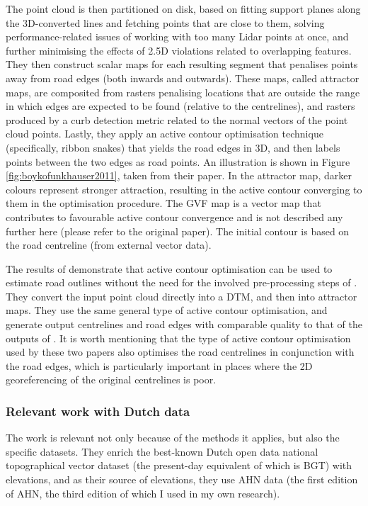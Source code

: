 The point cloud is then partitioned on disk, based on fitting support planes along the 3D-converted lines and fetching points that are close to them, solving performance-related issues of working with too many Lidar points at once, and further minimising the effects of 2.5D violations related to overlapping features. They then construct scalar maps for each resulting segment that penalises points away from road edges (both inwards and outwards). These maps, called attractor maps, are composited from rasters penalising locations that are outside the range in which edges are expected to be found (relative to the centrelines), and rasters produced by a curb detection metric related to the normal vectors of the point cloud points. Lastly, they apply an active contour optimisation technique (specifically, ribbon snakes) that yields the road edges in 3D, and then labels points between the two edges as road points. An illustration is shown in Figure \ref{fig:boykofunkhauser2011}, taken from their paper. In the attractor map, darker colours represent stronger attraction, resulting in the active contour converging to them in the optimisation procedure. The GVF map is a vector map that contributes to favourable active contour convergence and is not described any further here (please refer to the original paper). The initial contour is based on the road centreline (from external vector data).

The results of \cite{gopfert_etal_2011} demonstrate that active contour optimisation can be used to estimate road outlines without the need for the involved pre-processing steps of \cite{boyko_funkhauser_2011}. They convert the input point cloud directly into a DTM, and then into attractor maps. They use the same general type of active contour optimisation, and generate output centrelines and road edges with comparable quality to that of the outputs of \cite{boyko_funkhauser_2011}. It is worth mentioning that the type of active contour optimisation used by these two papers also optimises the road centrelines in conjunction with the road edges, which is particularly important in places where the 2D georeferencing of the original centrelines is poor.

\subsubsection{Relevant work with Dutch data}

The work \cite{oudeElberink_vosselman_2006} is relevant not only because of the methods it applies, but also the specific datasets. They enrich the best-known Dutch open data national topographical vector dataset (the present-day equivalent of which is BGT) with elevations, and as their source of elevations, they use AHN data (the first edition of AHN, the third edition of which I used in my own research).

